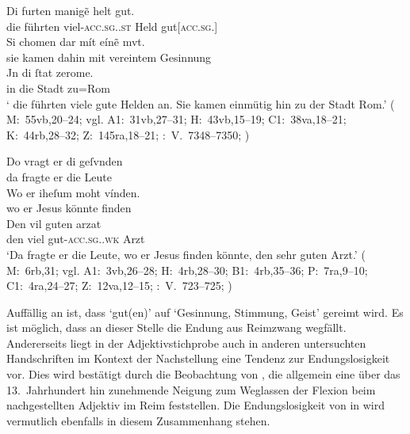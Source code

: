 \begin{exe}
\ex \label{ex:maccadj}
	\begin{xlist}
	\ex \label{ex:maccadj_1}
		\gll Di furten manigẽ helt gut. \\
			die führten viel-\textsc{acc.sg.\MascM.st} Held
			gut[\textsc{acc.sg.\MascM}] \\
	\sn \gll Si chomen dar mít eínẽ mvt. \\
			sie kamen dahin mit vereintem Gesinnung \\
	\sn \gll Jn di ſtat zerome. \\
			in die Stadt zu=Rom \\
		\trans `\textelp{} die führten viele gute Helden an. Sie kamen einmütig
			hin zu der Stadt Rom.'
			(%
				M:~55vb,20--24; vgl.
				A1:~31vb,27--31;
				H:~43vb,15--19;
				C1:~38va,18--21;
				K:~44rb,28--32;
				Z:~145ra,18--21;
				\KC:~V.~7348--7350;
				\cite[216]{schroeder1895}%
			)

	\ex \label{ex:maccadj_2}
		\gll Do vragt er di geſvnden \\
			da fragte er die Leute \\
	\sn \gll Wo er iheſum moht vínden. \\
			wo er Jesus könnte finden \\
	\sn \gll Den vil guten arzat \\
			den viel gut-\textsc{acc.sg.\MascM.wk} Arzt \\
		\trans `Da fragte er die Leute, wo er Jesus finden
			könnte, den sehr guten Arzt.'
			(%
				M:~6rb,31; vgl.
				A1:~3vb,26--28;
				H:~4rb,28--30;
				B1:~4rb,35--36;
				P:~7ra,9--10;
				C1:~4ra,24--27;
				Z:~12va,12--15;
				\KC:~V.~723--725;
				\cite[94]{schroeder1895}%
			)
		\\
	\end{xlist}
\end{exe}

Auffällig an  ist, dass  `gut(en)' auf
 `Gesinnung, Stimmung, Geist' gereimt wird. Es ist möglich, dass an
dieser Stelle die Endung aus Reimzwang wegfällt. Andererseits liegt in der
Adjektivstichprobe auch in anderen untersuchten Handschriften im Kontext der
Nachstellung eine Tendenz zur Endungslosigkeit vor. Dies wird bestätigt durch
die Beobachtung von \citet[241]{ksw2}, die allgemein eine über das
13.~Jahrhundert hin zunehmende Neigung zum Weglassen der Flexion beim
nachgestellten Adjektiv im Reim feststellen. Die Endungslosigkeit von
 in  wird vermutlich ebenfalls in diesem
Zusammenhang stehen.

